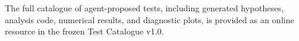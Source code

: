 The full catalogue of agent-proposed tests, including generated hypotheses,
analysis code, numerical results, and diagnostic plots, is provided as an
online resource in the frozen Test Catalogue v1.0.
